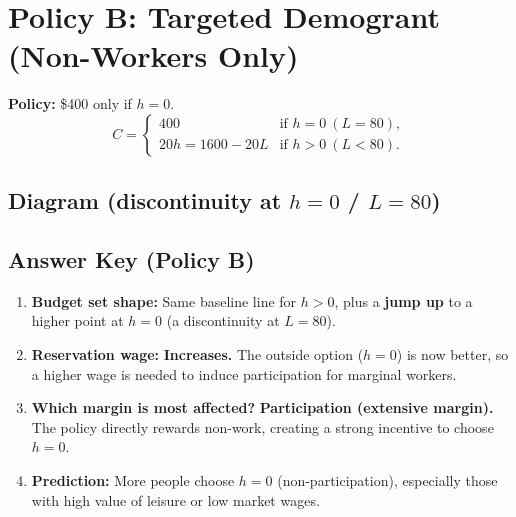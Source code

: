 \documentclass[12pt]{article}
\begin{document}
\newpage

\section*{Policy B: Targeted Demogrant (Non-Workers Only)}

\textbf{Policy:} \$400 only if \(h=0\).
\[
C =
\begin{cases}
400 & \text{if } h=0 \ (L=80),\\
20h = 1600-20L & \text{if } h>0 \ (L<80).
\end{cases}
\]

\subsection*{Diagram (discontinuity at $h=0$ / $L=80$)}

\begin{center}
\end{center}

\subsection*{Answer Key (Policy B)}

\begin{enumerate}
\item \textbf{Budget set shape:} Same baseline line for \(h>0\), plus a \textbf{jump up} to a higher point at \(h=0\) (a discontinuity at \(L=80\)).
\item \textbf{Reservation wage:} \textbf{Increases.} The outside option (\(h=0\)) is now better, so a higher wage is needed to induce participation for marginal workers.
\item \textbf{Which margin is most affected?} \textbf{Participation (extensive margin).} The policy directly rewards non-work, creating a strong incentive to choose \(h=0\).
\item \textbf{Prediction:} More people choose \(h=0\) (non-participation), especially those with high value of leisure or low market wages.
\end{enumerate}
\end{document}
